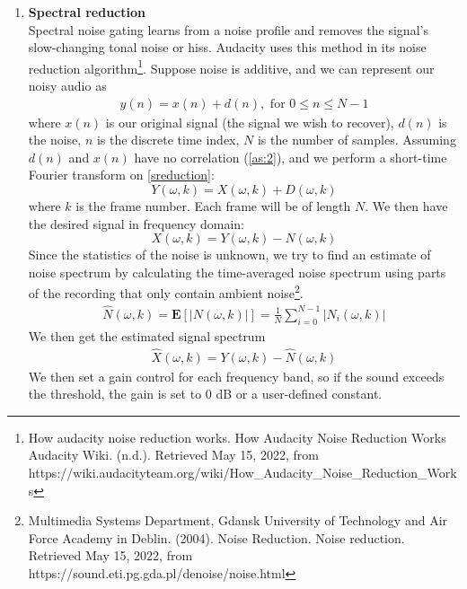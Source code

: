 \begin{enumerate}
    \item \textbf{Spectral reduction}\\
    Spectral noise gating learns from a noise profile and removes the signal's slow-changing tonal noise or hiss. Audacity uses this method in its noise reduction algorithm\footnote{How audacity noise reduction works. How Audacity Noise Reduction Works \- Audacity Wiki. (n.d.). Retrieved May 15, 2022, from https://wiki.audacityteam.org/wiki/How\_Audacity\_Noise\_Reduction\_Works}.
    Suppose noise is additive, and we can represent our noisy audio as
    \begin{align}\label{sreduction} 
    y(n) = x(n) + d(n), \text{ for } 0 \leq n \leq N-1 
    \end{align}
    where $x(n)$ is our original signal (the signal we wish to recover), $d(n)$ is the noise, $n$ is the discrete time index,
    $N$ is the number of samples. 
    Assuming $d(n)$ and $x(n)$ have no correlation (\cref{as:2}), and we perform a short-time Fourier transform on \cref{sreduction}:
    \[Y(\omega,k)= X(\omega,k) + D(\omega,k)\]
    where $k$ is the frame number. Each frame will be of
    length $N$. We then have the desired signal in frequency domain:
    \[X(\omega,k) = Y(\omega,k) - N(\omega,k)\]
    Since the statistics of the noise is unknown, we try to find an estimate of noise spectrum by calculating the time-averaged
    noise spectrum using parts of the recording that only contain ambient noise\footnote{Multimedia Systems Department, Gdansk University of Technology and Air Force Academy in Deblin. (2004). Noise Reduction. Noise reduction. Retrieved May 15, 2022, from https://sound.eti.pg.gda.pl/denoise/noise.html}.
    \begin{align} 
    \hat{N}(\omega,k) = \textbf{E}[|N(\omega,k)|] = \frac{1}{N}\sum_{i=0}^{N-1}|N_i(\omega,k)|
    \end{align}
    We then get the estimated signal spectrum
    \begin{align}
    \hat{X}(\omega,k) = Y(\omega,k) - \hat{N}(\omega,k)
    \end{align}
    We then set a gain control for each frequency band, so if the sound exceeds the threshold, the gain is set to 0 dB or a user-defined
    constant.
\end{enumerate}
